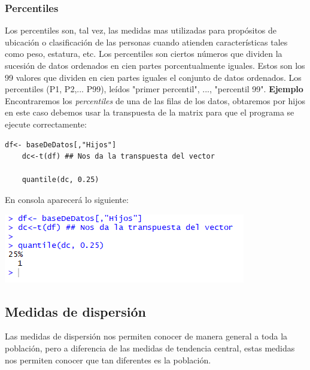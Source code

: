 \documentclass[12pt,hidelinks]{article}
\begin{document}
	\subsubsection{Percentiles}
	Los percentiles son, tal vez, las medidas mas utilizadas para propósitos de ubicación o clasificación de las personas cuando atienden características tales como peso, estatura, etc. Los percentiles son ciertos números que dividen la sucesión de datos ordenados en cien partes porcentualmente iguales. Estos son los 99 valores que dividen en cien partes iguales el conjunto de datos ordenados. Los percentiles (P1, P2,... P99), leídos "primer percentil", ..., "percentil 99". \textbf{Ejemplo} Encontraremos los \textit{percentiles} de una de las filas de los datos, obtaremos por hijos en este caso debemos usar la transpuesta de la matrix para que el programa se ejecute correctamente:
	\begin{lstlisting}[frame=single]
	df<- baseDeDatos[,"Hijos"]
	dc<-t(df) ## Nos da la transpuesta del vector
	
	quantile(dc, 0.25)
	\end{lstlisting}
	En consola aparecerá lo siguiente:
	\begin{center}
		\includegraphics[]{images/2/Percentiles.PNG}
	\end{center}
	\subsection{Medidas de dispersión} Las medidas de dispersión nos permiten conocer de manera general a toda la población, pero a diferencia de las medidas de tendencia central, estas medidas nos permiten conocer que tan diferentes es la población.
\end{document}
